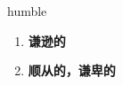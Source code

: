 
\begin{frame}
{\huge humble}
\begin{center}
\begin{enumerate}\Large
  \item \textbf{谦逊的}
  \item \textbf{顺从的，谦卑的}
\end{enumerate}
\end{center}
\end{frame}

